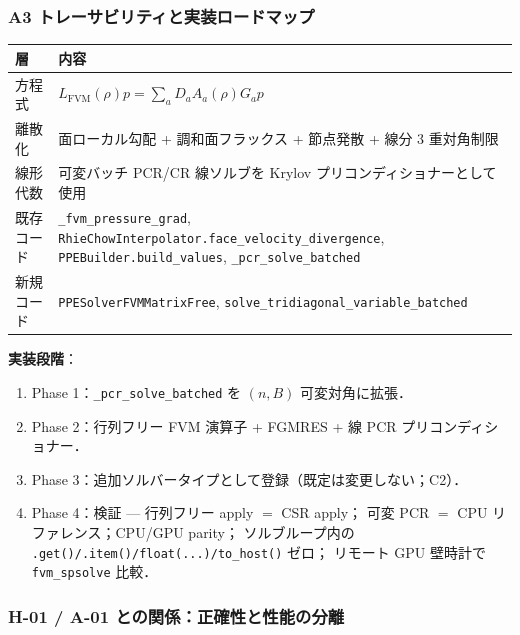 \subsubsection{A3 トレーサビリティと実装ロードマップ}
\label{sec:gpu_fvm_a3_roadmap}

\begin{center}
\footnotesize
\begin{tabular}{@{}p{}>{\raggedright\arraybackslash}p{}@{}}
\hline
層 & 内容 \\
\hline
方程式 & $L_\text{FVM}(\rho)p = \sum_a D_a A_a(\rho)G_a p$ \\
離散化 & 面ローカル勾配 + 調和面フラックス + 節点発散 + 線分 3 重対角制限 \\
線形代数 & 可変バッチ PCR/CR 線ソルブを Krylov プリコンディショナーとして使用 \\
既存コード & \texttt{\_fvm\_pressure\_grad},
  \texttt{RhieChowInterpolator.face\_velocity\_divergence},
  \texttt{PPEBuilder.build\_values},
  \texttt{\_pcr\_solve\_batched} \\
新規コード & \texttt{PPESolverFVMMatrixFree},
  \texttt{solve\_tridiagonal\_variable\_batched} \\
\hline
\end{tabular}
\end{center}

\noindent\textbf{実装段階}：
\begin{enumerate}[noitemsep]
  \item Phase 1：\texttt{\_pcr\_solve\_batched} を $(n,B)$ 可変対角に拡張．
  \item Phase 2：行列フリー FVM 演算子 + FGMRES + 線 PCR プリコンディショナー．
  \item Phase 3：追加ソルバータイプとして登録（既定は変更しない；C2）．
  \item Phase 4：検証 — 行列フリー apply $=$ CSR apply；
        可変 PCR $=$ CPU リファレンス；CPU/GPU parity；
        ソルブループ内の \texttt{.get()/.item()/float(...)/to\_host()} ゼロ；
        リモート GPU 壁時計で \texttt{fvm\_spsolve} 比較．
\end{enumerate}

\subsubsection{H-01 / A-01 との関係：正確性と性能の分離}
\label{sec:gpu_fvm_h01_a01}

